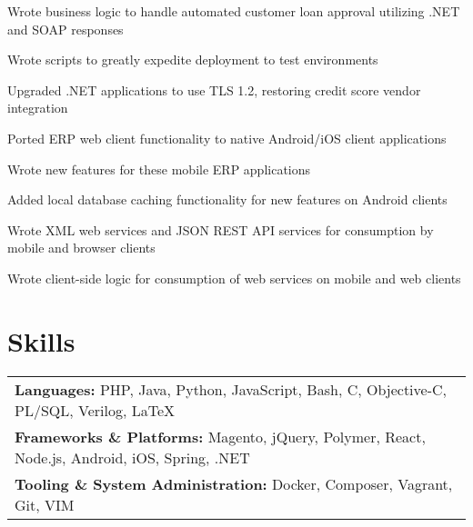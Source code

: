 \documentclass[line]{resume}
\begin{document}
\begin{myitemize}
	\item Wrote business logic to handle automated customer loan approval utilizing .NET and SOAP responses
	\item Wrote scripts to greatly expedite deployment to test environments
	\item Upgraded .NET applications to use TLS 1.2, restoring credit score vendor integration
\end{myitemize}

\begin{myitemize}
	\item Ported ERP web client functionality to native Android/iOS client applications
	\item Wrote new features for these mobile ERP applications
	\item Added local database caching functionality for new features on Android clients
	\item Wrote XML web services and JSON REST API services for consumption by mobile and browser clients
	\item Wrote client-side logic for consumption of web services on mobile and web clients
\end{myitemize}

\section{Skills}
\begin{tabularx}{\linewidth}{X}
	\textbf{Languages:} PHP, Java, Python, JavaScript, Bash, C, Objective-C, PL/SQL, Verilog, \LaTeX \\
	\textbf{Frameworks \& Platforms:} Magento, jQuery, Polymer, React, Node.js, Android, iOS, Spring, .NET \\
	\textbf{Tooling \& System Administration:} Docker, Composer, Vagrant, Git, VIM \\
\end{tabularx}
\end{document}
